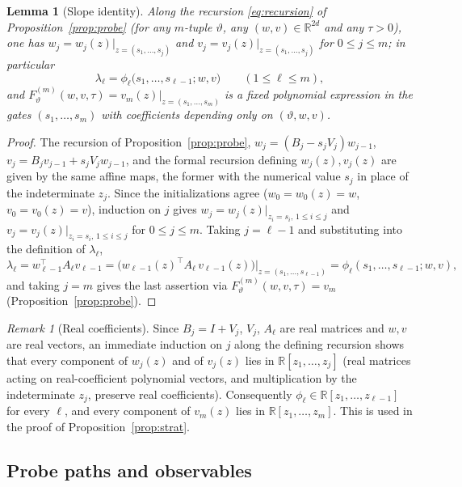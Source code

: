 \documentclass[11pt]{article}
\newtheorem{lemma}[theorem]{Lemma}
\theoremstyle{definition}
\theoremstyle{remark}
\newtheorem{remark}[theorem]{Remark}
\theoremstyle{plain}
\newcommand{\R}{\mathbb{R}}
\begin{document}
\begin{lemma}[Slope identity]\label{lem:lambdaphi}
Along the recursion \eqref{eq:recursion} of Proposition~\ref{prop:probe} (for any $m$-tuple
$\vartheta$, any $(w,v)\in\R^{2d}$ and any $\tau>0$), one has
$w_j=w_j(z)\big|_{z=(s_1,\dots,s_j)}$ and $v_j=v_j(z)\big|_{z=(s_1,\dots,s_j)}$ for
$0\le j\le m$; in particular
\begin{equation}\label{eq:lambdaphi}
\lambda_\ell=\phi_\ell\big(s_1,\dots,s_{\ell-1};w,v\big)\qquad(1\le\ell\le m),
\end{equation}
and $F^{(m)}_\vartheta(w,v,\tau)=v_m(z)\big|_{z=(s_1,\dots,s_m)}$ is a fixed polynomial
expression in the gates $(s_1,\dots,s_m)$ with coefficients depending only on
$(\vartheta,w,v)$.
\end{lemma}

\begin{proof}
The recursion of Proposition~\ref{prop:probe},
$w_j=(B_j-s_jV_j)w_{j-1}$, $v_j=B_jv_{j-1}+s_jV_jw_{j-1}$,
and the formal recursion defining $w_j(z),v_j(z)$ are given by the same affine maps, the
former with the numerical value $s_j$ in place of the indeterminate $z_j$.  Since the
initializations agree ($w_0=w_0(z)=w$, $v_0=v_0(z)=v$), induction on $j$ gives
$w_j=w_j(z)|_{z_i=s_i,\,1\le i\le j}$ and $v_j=v_j(z)|_{z_i=s_i,\,1\le i\le j}$ for
$0\le j\le m$.  Taking $j=\ell-1$ and substituting into the definition of $\lambda_\ell$,
\[
\lambda_\ell=w_{\ell-1}^\top A_\ell v_{\ell-1}
=\Big(w_{\ell-1}(z)^\top A_\ell\,v_{\ell-1}(z)\Big)\Big|_{z=(s_1,\dots,s_{\ell-1})}
=\phi_\ell(s_1,\dots,s_{\ell-1};w,v),
\]
and taking $j=m$ gives the last assertion via $F^{(m)}_\vartheta(w,v,\tau)=v_m$
(Proposition~\ref{prop:probe}).
\end{proof}

\begin{remark}[Real coefficients]\label{rem:real}
Since $B_j=I+V_j$, $V_j$, $A_\ell$ are real matrices and $w,v$ are real vectors, an
immediate induction on $j$ along the defining recursion shows that every component of
$w_j(z)$ and of $v_j(z)$ lies in $\R[z_1,\dots,z_j]$ (real matrices acting on
real-coefficient polynomial vectors, and multiplication by the indeterminate $z_j$,
preserve real coefficients).  Consequently $\phi_\ell\in\R[z_1,\dots,z_{\ell-1}]$ for
every $\ell$, and every component of $v_m(z)$ lies in $\R[z_1,\dots,z_m]$.  This is used
in the proof of Proposition~\ref{prop:strat}.
\end{remark}

\subsection{Probe paths and observables}\label{subsec:paths}
\end{document}

